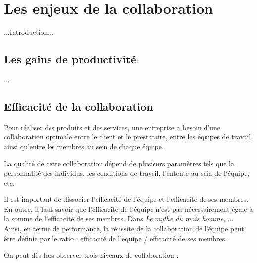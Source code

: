 \chapter{Les enjeux de la collaboration}

...Introduction...

\section{Les gains de productivité}

...

\section{Efficacité de la collaboration}

Pour réaliser des produits et des services, une entreprise a besoin d'une collaboration optimale entre le client et le prestataire, entre les équipes de travail, ainsi qu'entre les membres au sein de chaque équipe.

La qualité de cette collaboration dépend de plusieurs paramètres tels que la personnalité des individus, les conditions de travail, l'entente au sein de l'équipe, etc.

Il est important de dissocier l'efficacité de l'équipe et l'efficacité de ses membres. En outre, il faut savoir que l'efficacité de l'équipe n'est pas nécessairement égale à la somme de l'efficacité de ses membres. Dans \textit{Le mythe du mois homme}, ...\\

Ainsi, en terme de performance, la réussite de la collaboration de l'équipe peut être définie par le ratio : efficacité de l'équipe / efficacité de ses membres.

On peut dès lors observer trois niveaux de collaboration :

